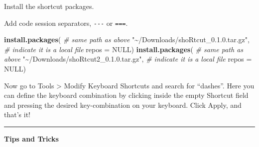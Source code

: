 \documentclass[
  a4paper,
  twoside,
  openright]{book}
\newenvironment{Shaded}{\begin{snugshade}}{\end{snugshade}}
\newcommand{\AttributeTok}[1]{\textcolor[rgb]{0.13,0.29,0.53}{#1}}
\newcommand{\CommentTok}[1]{\textcolor[rgb]{0.56,0.35,0.01}{\textit{#1}}}
\newcommand{\ConstantTok}[1]{\textcolor[rgb]{0.56,0.35,0.01}{#1}}
\newcommand{\FunctionTok}[1]{\textcolor[rgb]{0.13,0.29,0.53}{\textbf{#1}}}
\newcommand{\NormalTok}[1]{#1}
\newcommand{\StringTok}[1]{\textcolor[rgb]{0.31,0.60,0.02}{#1}}
\theoremstyle{definition}
\theoremstyle{definition}
\theoremstyle{definition}
\theoremstyle{definition}
\theoremstyle{remark}
\begin{document}
Install the shortcut packages.

Add code session separators, \texttt{-\/-\/-} or \texttt{===}.

\begin{Shaded}
\begin{Highlighting}[]
\FunctionTok{install.packages}\NormalTok{(}
    \CommentTok{\# same path as above}
  \StringTok{"\textasciitilde{}/Downloads/shoRtcut\_0.1.0.tar.gz"}\NormalTok{, }
  \CommentTok{\# indicate it is a local file}
  \AttributeTok{repos =} \ConstantTok{NULL}\NormalTok{)}
\FunctionTok{install.packages}\NormalTok{(}
    \CommentTok{\# same path as above}
  \StringTok{"\textasciitilde{}/Downloads/shoRtcut2\_0.1.0.tar.gz"}\NormalTok{, }
  \CommentTok{\# indicate it is a local file}
  \AttributeTok{repos =} \ConstantTok{NULL}\NormalTok{)}
\end{Highlighting}
\end{Shaded}

Now go to Tools \textgreater{} Modify Keyboard Shortcuts and search for ``dashes''. Here you can define the keyboard combination by clicking inside the empty Shortcut field and pressing the desired key-combination on your keyboard. Click Apply, and that's it!

\begin{center}\rule{0.5\linewidth}{0.5pt}\end{center}

\textbf{Tips and Tricks}
\end{document}
